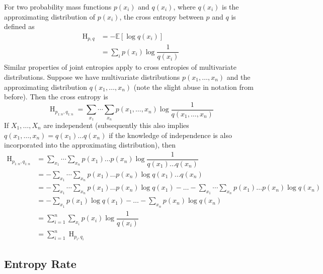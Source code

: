 \documentclass[11pt]{report} %
\begin{document}
For two probability mass functions $p\left(x_{i}\right)$ and $q\left(x_{i}\right)$, where $q\left(x_{i}\right)$ is the approximating distribution of $p\left(x_{i}\right)$, the cross entropy between $p$ and $q$ is defined as
\begin{align}
\operatorname{H}_{p, q} &= -\mathbb{E}\left[\log q\left(x_{i}\right)\right]\\
&= \sum_{i}p\left(x_{i}\right)\log\dfrac{1}{q\left(x_{i}\right)}
\end{align}
Similar properties of joint entropies apply to cross entropies of multivariate distributions. Suppose we have multivariate distributions $p\left(x_{1}, \dots, x_{n}\right)$ and the approximating distribution $q\left(x_{1}, \dots, x_{n}\right)$ (note the slight abuse in notation from before). Then the cross entropy is
\begin{equation}
\operatorname{H}_{p_{1:n}, q_{1:n}} = \sum_{x_{1}}\cdots\sum_{x_{n}}p\left(x_{1}, \dots, x_{n}\right)\log\dfrac{1}{q\left(x_{1}, \dots, x_{n}\right)}
\end{equation}
If $X_{1}, \dots, X_{n}$ are independent (subsequently this also implies $q\left(x_{1}, \dots, x_{n}\right) = q\left(x_{1}\right)\dots q\left(x_{n}\right)$ if the knowledge of independence is also incorporated into the approximating distribution), then
\begin{align}
\operatorname{H}_{p_{1:n}, q_{1:n}} &= \sum_{x_{1}}\cdots\sum_{x_{n}}p\left(x_{1}\right)\dots p\left(x_{n}\right)\log\dfrac{1}{q\left(x_{1}\right)\dots q\left(x_{n}\right)} \\
&= - \sum_{x_{1}}\cdots\sum_{x_{n}}p\left(x_{1}\right)\dots p\left(x_{n}\right)\log q\left(x_{1}\right)\dots q\left(x_{n}\right) \\
&= - \sum_{x_{1}}\cdots\sum_{x_{n}}p\left(x_{1}\right)\dots p\left(x_{n}\right)\log q\left(x_{1}\right) - \dots - \sum_{x_{1}}\cdots\sum_{x_{n}}p\left(x_{1}\right)\dots p\left(x_{n}\right)\log q\left(x_{n}\right) \\
&= - \sum_{x_{1}}p\left(x_{1}\right)\log q\left(x_{1}\right) - \dots - \sum_{x_{n}}p\left(x_{n}\right)\log q\left(x_{n}\right) \\
&= \sum_{i = 1}^{n}\sum_{x_{i}}p\left(x_{i}\right)\log\dfrac{1}{q\left(x_{i}\right)} \\
&= \sum_{i = 1}^{n}\operatorname{H}_{p_{i},q_{i}}
\end{align}

\subsection{Entropy Rate}
\end{document}
